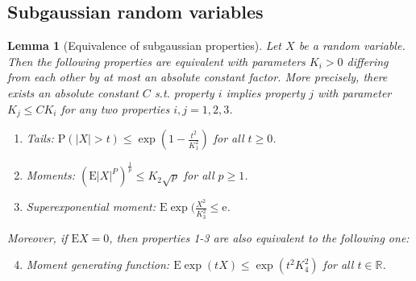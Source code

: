 \documentclass[13pt]{article}
\newtheorem{lem}[thm]{Lemma}
\theoremstyle{plain}
\newcommand{\R}{\mathbb{R}}
\newcommand{\E}{\bm{\mathrm{E}}}
\renewcommand{\P}{\bm{\mathrm{P}}}
\newcommand{\e}{\mathrm{e}}
\begin{document}
\subsection{Subgaussian random variables}

\begin{lem}[Equivalence of subgaussian properties]
    Let $X$ be a random variable. Then the following properties
    are equivalent with parameters $K_i > 0$ differing from each other by at most an absolute constant factor.
    More precisely, there exists an absolute constant $C$ s.t.
    property $i$ implies property $j$ with parameter $K_j \le CK_i$
    for any two properties $i,j = 1,2,3$.
    \begin{enumerate}
        \item Tails: $\P(|X|>t) \le \exp\left( 1 - \frac{t^2}{K_1^2} \right) $ for all $t \ge 0$.
        \item Moments: $\left( \E|X|^P \right)^{\frac{1}{p}} \le K_2 \sqrt{p}$ for all $p \ge 1$.
        \item Superexponential moment: $\E\exp(\frac{X^2}{K_3^2} \le \e$.
    \end{enumerate}
    Moreover, if $\E X = 0$, then properties 1-3 are also equivalent to the following one:
    \begin{enumerate}
        \setcounter{enumi}{3}
        \item Moment generating function: $\E\exp(tX) \le \exp(t^2K_4^2)$ for all $t \in \R$.
    \end{enumerate}
\end{lem}

\newpage

\printbibliography[heading=bibintoc]
\end{document}
